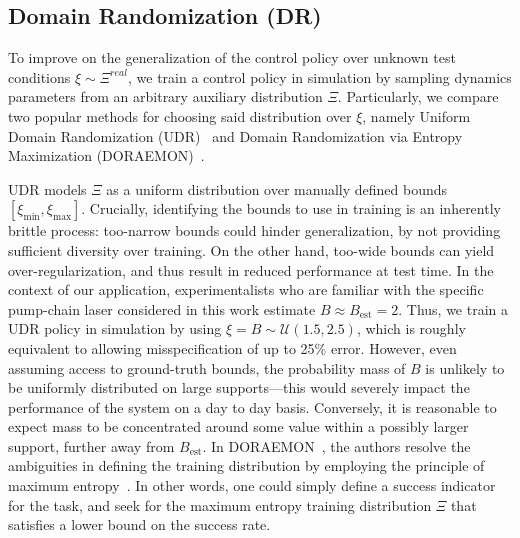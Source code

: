 
\subsection{Domain Randomization (DR)}
To improve on the generalization of the control policy over unknown test conditions $\xi \sim \Xi^{real} $, we train a control policy in simulation by sampling dynamics parameters from an arbitrary auxiliary distribution $\Xi$. Particularly, we compare two popular methods for choosing said distribution over $\xi$, namely Uniform Domain Randomization (UDR)~\citep{tobin2017domain, sadeghi2016cad2rl} and Domain Randomization via Entropy Maximization (DORAEMON)~\citep{tiboni2023domain}.

UDR models \( \Xi \) as a uniform distribution over manually defined bounds \( [\xi_{\min}, \xi_{\max}] \).
Crucially, identifying the bounds to use in training is an inherently brittle process: too-narrow bounds could hinder generalization, by not providing sufficient diversity over training. On the other hand, too-wide bounds can yield over-regularization, and thus result in reduced performance at test time. In the context of our application, experimentalists who are familiar with the specific pump-chain laser considered in this work estimate \( B \approx B_{\text{est}} = 2 \). Thus, we train a UDR policy in simulation by using $\xi = B \sim \mathcal U(1.5, 2.5)$, which is roughly equivalent to allowing misspecification of up to 25\% error.
However, even assuming access to ground-truth bounds, the probability mass of \( B \) is unlikely to be uniformly distributed on large supports---this would severely impact the performance of the system on a day to day basis. Conversely, it is reasonable to expect mass to be concentrated around some value within a possibly larger support, further away from \( B_{\text{est}} \).
In DORAEMON~\citep{tiboni2023domain}, the authors resolve the ambiguities in defining the training distribution by employing the principle of maximum entropy~\citep{jaynes1957information}. In other words, one could simply define a success indicator for the task, and seek for the maximum entropy training distribution \( \Xi \) that satisfies a lower bound on the success rate.


